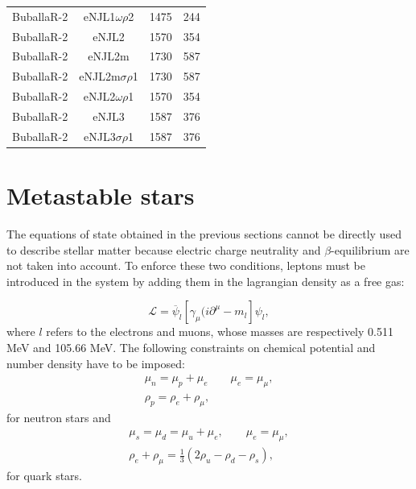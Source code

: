 \documentclass[prc, reprint, amsmath, floatfix,10pt]{revtex4-1}
\begin{document}
\begin{table}[!htpb]
\begin{ruledtabular}
\begin{tabular}{cccc}
BuballaR-2 & eNJL1$\omega\rho$2 & 1475 & 244 \\
BuballaR-2 & eNJL2 & 1570 & 354 \\
BuballaR-2 & eNJL2m & 1730 & 587\\
BuballaR-2 & eNJL2m$\sigma\rho$1 & 1730 & 587 \\
BuballaR-2 & eNJL2$\omega\rho$1 & 1570 & 354 \\
BuballaR-2 & eNJL3 & 1587 & 376 \\
BuballaR-2 & eNJL3$\sigma\rho$1 & 1587 & 376 \\
\end{tabular}
\end{ruledtabular}
\end{table}


\section{Metastable stars}

The equations of state obtained in the previous sections cannot be
directly used to describe stellar matter because electric charge
neutrality and $\beta$-equilibrium are not taken
into account. To enforce these two conditions, leptons must be
introduced in the system by adding them in the lagrangian density as a
free gas:

\begin{equation}
\mathscr{L}=\overline{\psi}_l[\gamma_\mu(i\partial^\mu -m_l]\psi_l,
\end{equation}
where $l$ refers to the electrons and muons, whose masses are
respectively 0.511 MeV and 105.66 MeV.
The following constraints on chemical
potential and number density have to be imposed:
\begin{eqnarray}
\mu_n=\mu_p +\mu_e  \qquad \mu_e=\mu_{\mu},\\
\rho_p =\rho_e + \rho_{\mu},
\end{eqnarray}
for neutron stars and
\begin{eqnarray}
\mu_s=\mu_d=\mu_u+\mu_e, \qquad \mu_e=\mu_{\mu}, \\
\rho_e+\rho_{\mu}=\frac{1}{3}(2\rho_u-\rho_d-\rho_s),
\end{eqnarray}
for quark stars.
\end{document}
